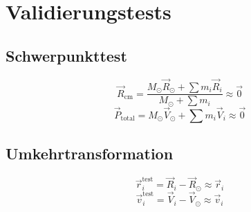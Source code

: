 \section{Validierungstests}
\subsection{Schwerpunkttest}
\[
\vec{R}_{\text{cm}} = \frac{M_\odot \vec{R}_\odot + \sum m_i \vec{R}_i}{M_\odot + \sum m_i} \approx \vec{0}
\]
\[
\vec{P}_{\text{total}} = M_\odot \vec{V}_\odot + \sum m_i \vec{V}_i \approx \vec{0}
\]

\subsection{Umkehrtransformation}
\[
\vec{r}_i^{\text{test}} = \vec{R}_i - \vec{R}_\odot \approx \vec{r}_i
\]
\[
\vec{v}_i^{\text{test}} = \vec{V}_i - \vec{V}_\odot \approx \vec{v}_i
\]